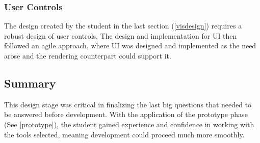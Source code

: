 \subsubsection{User Controls}
The design created by the student in the last section (\ref{visdesign}) requires a robust design of user controls. The design and implementation for UI then followed an agile approach, where UI was designed and implemented as the need arose and the rendering counterpart could support it.

\subsection{Summary}
This design stage was critical in finalizing the last big questions that needed to be answered before development. With the application of the prototype phase (See \ref{prototype}), the student gained experience and confidence in working with the tools selected, meaning development could proceed much more smoothly.
